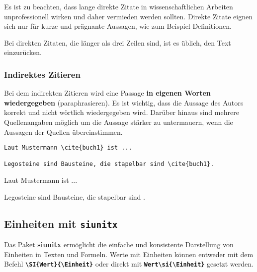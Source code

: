 Es ist zu beachten, dass lange direkte Zitate in wissenschaftlichen Arbeiten unprofessionell wirken und daher vermieden werden sollten. Direkte Zitate eignen sich nur für kurze und prägnante Aussagen, wie zum Beispiel Definitionen.

Bei direkten Zitaten, die länger als drei Zeilen sind, ist es üblich, den Text einzurücken.

\subsubsection{Indirektes Zitieren}
Bei dem indirekten Zitieren wird eine Passage \textbf{in eigenen Worten wiedergegeben} (paraphrasieren). Es ist wichtig, dass die Aussage des Autors korrekt und nicht wörtlich wiedergegeben wird.
Darüber hinaus sind mehrere Quellenangaben möglich um die Aussage stärker zu untermauern, wenn die Aussagen der Quellen übereinstimmen.

\begin{minipage}[c]{0.55\textwidth}
    \begin{lstlisting}[language={[LaTeX]TeX}]
Laut Mustermann \cite{buch1} ist ...

Legosteine sind Bausteine, die stapelbar sind \cite{buch1}.
    \end{lstlisting}
\end{minipage}
\hfill
\begin{minipage}[c]{0.38\textwidth}
    Laut Mustermann \cite{buch1} ist ...

    Legosteine sind Bausteine, die stapelbar sind \cite{buch1}.
\end{minipage}


\subsection{Einheiten mit \texttt{siunitx}}

Das Paket \textbf{siunitx} ermöglicht die einfache und konsistente Darstellung von Einheiten in Texten und Formeln.
Werte mit Einheiten können entweder mit dem Befehl \textbf{\texttt{\textbackslash SI\{Wert\}\{\textbackslash Einheit\}}} oder direkt mit \textbf{\texttt{Wert\textbackslash si\{\textbackslash Einheit\}}} gesetzt werden.

